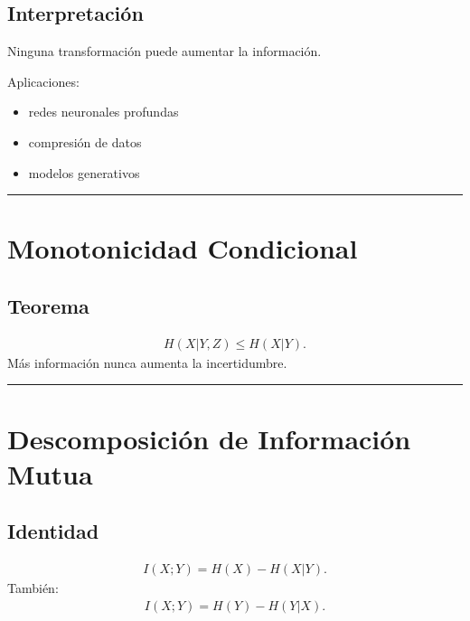 \documentclass[letterpaper,10pt,english]{jupyterBook}
\begin{document}
\subsection{Interpretación}
\label{\detokenize{02_mathematical_foundations/properties_theorems:id12}}
\sphinxAtStartPar
Ninguna transformación puede aumentar la información.

\sphinxAtStartPar
Aplicaciones:
\begin{itemize}
\item {} 
\sphinxAtStartPar
redes neuronales profundas

\item {} 
\sphinxAtStartPar
compresión de datos

\item {} 
\sphinxAtStartPar
modelos generativos

\end{itemize}


\bigskip\hrule\bigskip



\section{Monotonicidad Condicional}
\label{\detokenize{02_mathematical_foundations/properties_theorems:monotonicidad-condicional}}

\subsection{Teorema}
\label{\detokenize{02_mathematical_foundations/properties_theorems:id13}}\begin{equation*}
\begin{split}
H(X|Y,Z)\le H(X|Y).
\end{split}
\end{equation*}
\sphinxAtStartPar
Más información nunca aumenta la incertidumbre.


\bigskip\hrule\bigskip



\section{Descomposición de Información Mutua}
\label{\detokenize{02_mathematical_foundations/properties_theorems:descomposicion-de-informacion-mutua}}

\subsection{Identidad}
\label{\detokenize{02_mathematical_foundations/properties_theorems:identidad}}\begin{equation*}
\begin{split}
I(X;Y)=H(X)-H(X|Y).
\end{split}
\end{equation*}
\sphinxAtStartPar
También:
\begin{equation*}
\begin{split}
I(X;Y)=H(Y)-H(Y|X).
\end{split}
\end{equation*}
\end{document}
